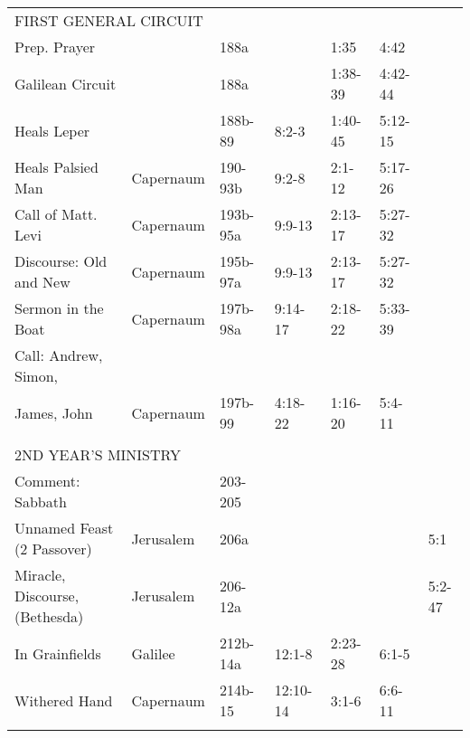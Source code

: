 \begin{longtable}[h]{lllllll}
\\
\multicolumn{7}{l}{FIRST GENERAL CIRCUIT} \\
Prep. Prayer                       &                     & 188a       &                 & 1:35            & 4:42                 & \\
Galilean Circuit                   &                     & 188a       &                 & 1:38-39         & 4:42-44              & \\
Heals Leper                        &                     & 188b-89    & 8:2-3           & 1:40-45         & 5:12-15              & \\
Heals Palsied Man                  & Capernaum           & 190-93b    & 9:2-8           & 2:1-12          & 5:17-26              & \\
Call of Matt. Levi                 & Capernaum           & 193b-95a   & 9:9-13          & 2:13-17         & 5:27-32              & \\
Discourse: Old and New             & Capernaum           & 195b-97a   & 9:9-13          & 2:13-17         & 5:27-32              & \\
Sermon in the Boat                 & Capernaum           & 197b-98a   & 9:14-17         & 2:18-22         & 5:33-39              & \\
Call: Andrew, Simon, \\
\quad James, John                  & Capernaum           & 197b-99    & 4:18-22         & 1:16-20         & 5:4-11               & \\
\\
\multicolumn{7}{l}{2ND YEAR'S MINISTRY} \\
Comment: Sabbath                   &                     & 203-205    &                 &                 &                      & \\
Unnamed Feast (2 Passover)         & Jerusalem           & 206a       &                 &                 &                      & 5:1 \\
Miracle, Discourse, (Bethesda)     & Jerusalem           & 206-12a    &                 &                 &                      & 5:2-47 \\
In Grainfields                     & Galilee             & 212b-14a   & 12:1-8          & 2:23-28         & 6:1-5                & \\
Withered Hand                      & Capernaum           & 214b-15    & 12:10-14        & 3:1-6           & 6:6-11               & \\
\\

\end{longtable}
